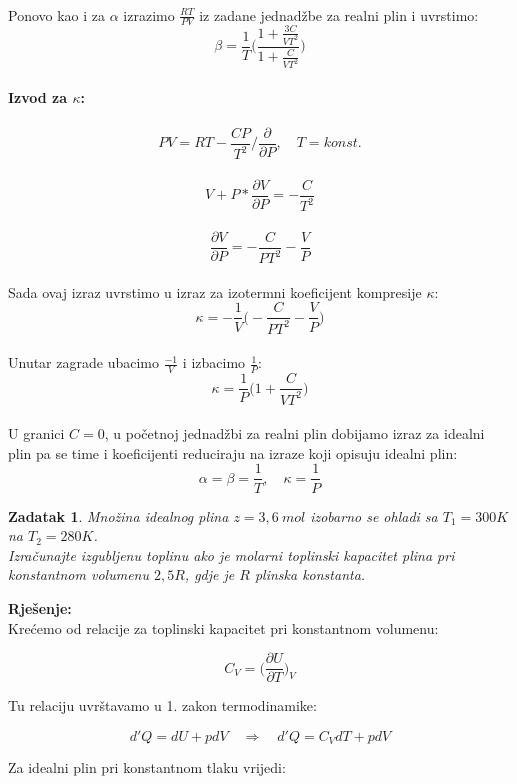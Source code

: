 \documentclass[a4paper,12pt]{article}
\newtheorem{ZDK}{Zadatak}[section]
\begin{document}
\\
Ponovo kao i za $\alpha$ izrazimo $\frac{RT}{PV}$ iz zadane jednad\v{z}be za realni plin i uvrstimo:
\\
$$ \beta=\frac{1}{T} \Big( \frac{1+\frac{3C}{VT^2}}{1+\frac{C}{VT^2}} \Big) $$
\\
\textbf{Izvod za $\kappa$:} \\
\\
$$ PV=RT-\frac{CP}{T^2} \Big/ \frac{\partial}{\partial P}, \quad  T=konst. $$
\\
$$ V+P*\frac{\partial V}{\partial P}=-\frac{C}{T^2} $$
\\
$$ \frac{\partial V}{\partial P}=-\frac{C}{PT^2}-\frac{V}{P} $$
\\
Sada ovaj izraz uvrstimo u izraz za izotermni koeficijent kompresije $\kappa$:
\\
$$ \kappa=-\frac{1}{V} \Big( -\frac{C}{PT^2}-\frac{V}{P} \Big) $$
\\
Unutar zagrade ubacimo $\frac{-1}{V}$ i izbacimo $\frac{1}{P}$:
\\
$$ \kappa=\frac{1}{P} \Big( 1+ \frac{C}{VT^2} \Big) $$
\\
U granici $C=0$, u po\v{c}etnoj jednad\v{z}bi za realni plin dobijamo izraz za idealni plin pa se time i koeficijenti reduciraju na izraze 
koji opisuju idealni plin: 
\\
$$ \alpha=\beta=\frac{1}{T}, \quad \kappa=\frac{1}{P} $$


\newpage
\begin{ZDK}
	Mno\v{z}ina idealnog plina $z=3,6\ mol$ izobarno se ohladi sa $T_1=300K$ na $T_2=280K$. \\
	Izra\v{c}unajte izgubljenu toplinu ako je molarni toplinski kapacitet plina pri konstantnom volumenu $2,5R$, gdje je $R$ plinska konstanta.
\end{ZDK}
\textbf{Rje\v{s}enje:} \\
\newline
Kre\'cemo od relacije za toplinski kapacitet pri konstantnom volumenu:

$$ C_V=\Big(\frac{\partial U}{\partial T}\Big)_V $$

Tu relaciju uvr\v{s}tavamo u 1. zakon termodinamike:

$$ d'Q=dU+pdV \quad  \Rightarrow \quad d'Q=C_VdT+pdV $$

Za idealni plin pri konstantnom tlaku vrijedi:
\end{document}
